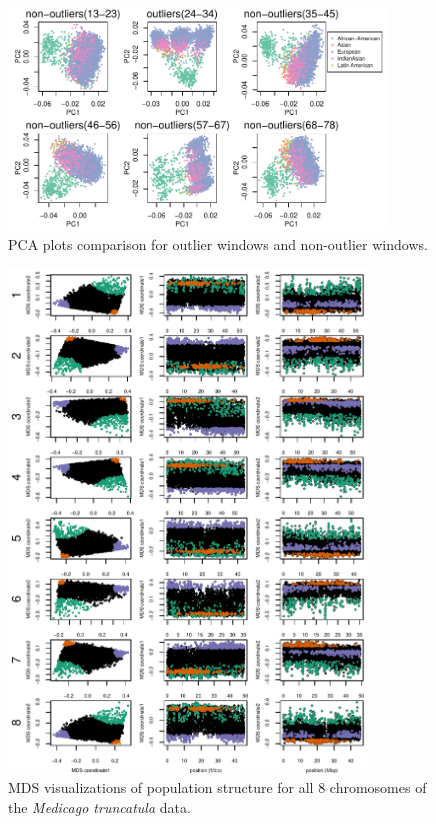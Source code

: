 \documentclass[11pt, oneside]{article}   	%
\begin{document}
\begin{figure}
    \begin{center}
       \includegraphics[width=0.9\textwidth]{FigS_PCA_chr8_outliers_combine_update}
    \end{center}
    \caption{
        PCA plots comparison for outlier windows and non-outlier windows.
        \label{fig:pca_chr8_outliers}
    }
\end{figure}

\begin{figure}
    \begin{center}
       \includegraphics[width=0.85\textwidth]{FigS_Together_MDS_plot_allchr}
    \end{center}
    \caption{
        MDS visualizations of population structure for all 8 chromosomes of the \textit{Medicago truncatula} data.
        \label{fig:mds_medicago_allchr}
    }
\end{figure}
\end{document}
